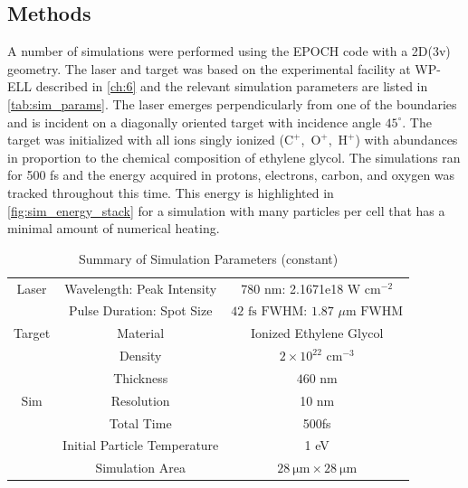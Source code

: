 \subsection{Methods}
A number of simulations were performed using the EPOCH code with a 2D(3v) geometry. The laser and target was based on the experimental facility at \gls{WP-ELL} described in \autoref{ch:6} and the relevant simulation parameters are listed in \autoref{tab:sim_params}. The laser emerges perpendicularly from one of the boundaries and is incident on a diagonally oriented target with incidence angle $45^\circ$. The target was initialized with all ions singly ionized ($\mathrm{C}^{+}$,~$\mathrm{O}^{+}$,~$\mathrm{H}^{+}$) with abundances in proportion to the chemical composition of ethylene glycol. The simulations ran for 500 fs and the energy acquired in protons, electrons, carbon, and oxygen was tracked throughout this time. This energy is highlighted in \autoref{fig:sim_energy_stack} for a simulation with many particles per cell that has a minimal amount of numerical heating.

\begin{table}
	\centering
	\begin{tabular}{c|c|c}
		\hline
		\hline
		Laser & Wavelength: Peak Intensity & 780 nm: 2.1671e18 W $\text{cm}^{-2}$\\
		\text{} & Pulse Duration: Spot Size & $\text{42}$ $\text{fs FWHM}$: $1.87$  $\mu\text{m FWHM}$\\
		\hline
		Target & Material & Ionized Ethylene Glycol\\
		\text{} & Density & $2\times10^{22}$ $\text{cm}^{-3}$\\
		\text{} & Thickness & $460$ $\text{nm}$ \\
		\hline
		Sim & Resolution & 10 nm\\
		\text{} & Total Time & 500fs\\
		\text{} & Initial Particle Temperature & 1 eV\\
		\text{} & Simulation Area & $\SI{28}{\micro \meter} \times \SI{28}{\micro \meter}$ \\
		\hline
		\hline
	\end{tabular}
	\caption{Summary of Simulation Parameters (constant)}
	\label{tab:sim_params}
\end{table}


